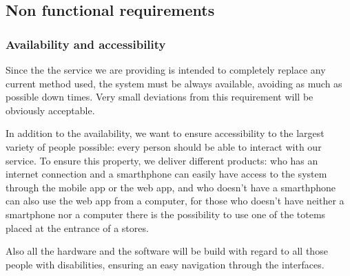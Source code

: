 %
\subsection{Non functional requirements}
\label{subsect:softwaresystemattributes}

\subsubsection{Availability and accessibility}
\label{subsubsect:availabilityandaccessibility}

Since the the service we are providing is intended to completely replace any current method used, the system must be always available, avoiding as much as possible down times. Very small deviations from this requirement will be obviously acceptable.

In addition to the availability, we want to ensure accessibility to the largest variety of people possible: every person should be able to interact with our service. To ensure this property, we deliver different products: who has an internet connection and a smarthphone can easily have access to the system through the mobile app or the web app, and who doesn't have a smarthphone can also use the web app from a computer, for those who doesn't have neither a smartphone nor a computer there is the possibility to use one of the totems placed at the entrance of a stores.

Also all the hardware and the software will be build with regard to all those people with disabilities, ensuring an easy navigation through the interfaces.

